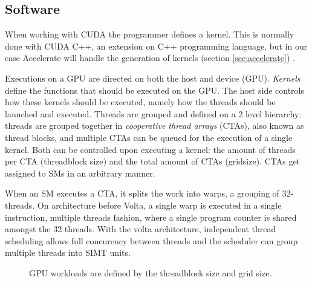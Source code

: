 \subsection{Software}
When working with CUDA the programmer defines a kernel.
This is normally done with CUDA C++, an extension on C++ programming language, but in our case Accelerate will handle the generation of kernels (section \ref{sec:accelerate}) \cite{nvidia2021cudadocs}.

Executions on a GPU are directed on both the host and device (GPU).
\textit{Kernels} define the functions that should be executed on the GPU.
The host side controls how these kernels should be executed, namely how the threads should be launched and executed.
Threads are grouped and defined on a 2 level hierarchy: threads are grouped together in \textit{cooperative thread arrays} (CTAs), also known as thread blocks, and multiple CTAs can be queued for the execution of a single kernel.
Both can be controlled upon executing a kernel: the amount of threads per CTA (threadblock size) and the total amount of CTAs (gridsize).
CTAs get assigned to SMs in an arbitrary manner.

When an SM executes a CTA, it splits the work into warps, a grouping of 32-threads.
On architecture before Volta, a single warp is executed in a single instruction, multiple threads fashion, where a single program counter is shared amongst the 32 threads.
With the volta architecture, independent thread scheduling allows full concurency between threads and the scheduler can group multiple threads into SIMT units.





\begin{figure}[!hb]
    \centering
    \caption{
        GPU workloads are defined by the threadblock size and grid size.
    }
\end{figure}

